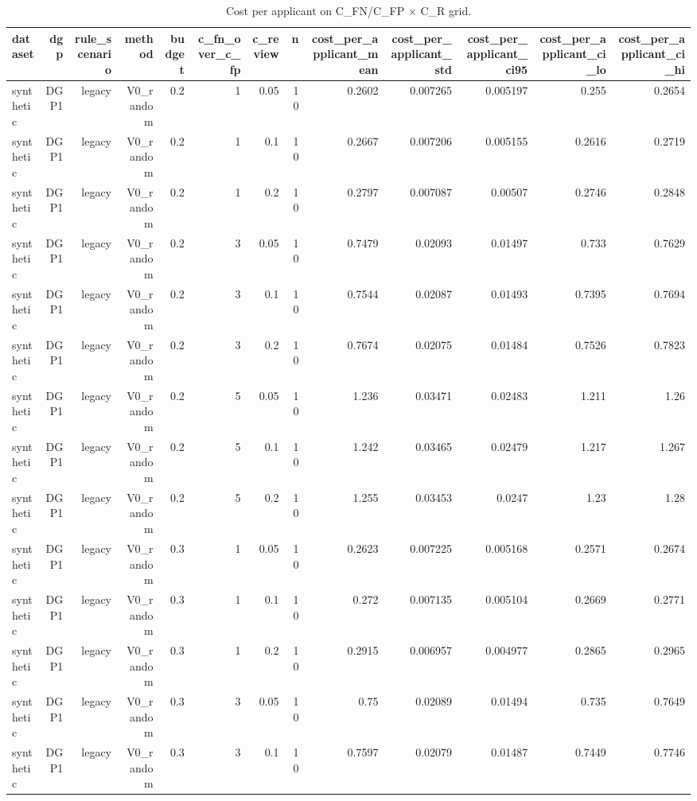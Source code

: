 \begin{table}[htbp]
  \centering
  \caption{Cost per applicant on C\_FN/C\_FP × C\_R grid.}
  \label{tab:T7_cost_sensitivity}
  \small
  \begin{tabular}{lrrrrrrrrrrrr}
    \toprule
    dataset & dgp & rule\_scenario & method & budget & c\_fn\_over\_c\_fp & c\_review & n & cost\_per\_applicant\_mean & cost\_per\_applicant\_std & cost\_per\_applicant\_ci95 & cost\_per\_applicant\_ci\_lo & cost\_per\_applicant\_ci\_hi \\
    \midrule
    synthetic & DGP1 & legacy & V0\_random & 0.2 & 1 & 0.05 & 10 & 0.2602 & 0.007265 & 0.005197 & 0.255 & 0.2654 \\
    synthetic & DGP1 & legacy & V0\_random & 0.2 & 1 & 0.1 & 10 & 0.2667 & 0.007206 & 0.005155 & 0.2616 & 0.2719 \\
    synthetic & DGP1 & legacy & V0\_random & 0.2 & 1 & 0.2 & 10 & 0.2797 & 0.007087 & 0.00507 & 0.2746 & 0.2848 \\
    synthetic & DGP1 & legacy & V0\_random & 0.2 & 3 & 0.05 & 10 & 0.7479 & 0.02093 & 0.01497 & 0.733 & 0.7629 \\
    synthetic & DGP1 & legacy & V0\_random & 0.2 & 3 & 0.1 & 10 & 0.7544 & 0.02087 & 0.01493 & 0.7395 & 0.7694 \\
    synthetic & DGP1 & legacy & V0\_random & 0.2 & 3 & 0.2 & 10 & 0.7674 & 0.02075 & 0.01484 & 0.7526 & 0.7823 \\
    synthetic & DGP1 & legacy & V0\_random & 0.2 & 5 & 0.05 & 10 & 1.236 & 0.03471 & 0.02483 & 1.211 & 1.26 \\
    synthetic & DGP1 & legacy & V0\_random & 0.2 & 5 & 0.1 & 10 & 1.242 & 0.03465 & 0.02479 & 1.217 & 1.267 \\
    synthetic & DGP1 & legacy & V0\_random & 0.2 & 5 & 0.2 & 10 & 1.255 & 0.03453 & 0.0247 & 1.23 & 1.28 \\
    synthetic & DGP1 & legacy & V0\_random & 0.3 & 1 & 0.05 & 10 & 0.2623 & 0.007225 & 0.005168 & 0.2571 & 0.2674 \\
    synthetic & DGP1 & legacy & V0\_random & 0.3 & 1 & 0.1 & 10 & 0.272 & 0.007135 & 0.005104 & 0.2669 & 0.2771 \\
    synthetic & DGP1 & legacy & V0\_random & 0.3 & 1 & 0.2 & 10 & 0.2915 & 0.006957 & 0.004977 & 0.2865 & 0.2965 \\
    synthetic & DGP1 & legacy & V0\_random & 0.3 & 3 & 0.05 & 10 & 0.75 & 0.02089 & 0.01494 & 0.735 & 0.7649 \\
    synthetic & DGP1 & legacy & V0\_random & 0.3 & 3 & 0.1 & 10 & 0.7597 & 0.02079 & 0.01487 & 0.7449 & 0.7746 \\

\end{tabular}
\end{table}
